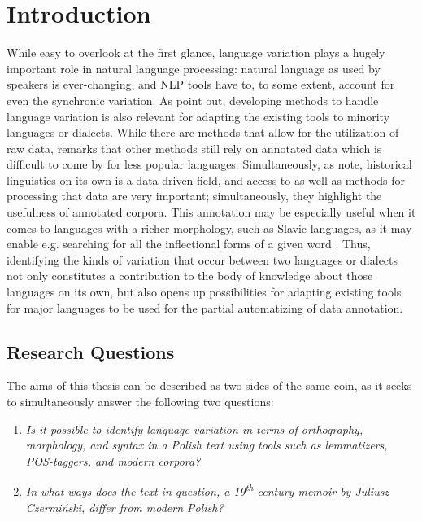 \section{Introduction}
\label{sec:intro}

While easy to overlook at the first glance, language variation plays a hugely important role in natural language processing: natural language as used by speakers is ever-changing, and NLP tools have to, to some extent, account for even the synchronic variation. As \citet{Zampieri2020NaturalLP} point out, developing methods to handle language variation is also relevant for adapting the existing tools to minority languages or dialects. While there are methods that allow for the utilization of raw data, \citet{ponti_2019} remarks that other methods still rely on annotated data which is difficult to come by for less popular languages. Simultaneously, as \citet{quantitative-historical} note, historical linguistics on its own is a data-driven field, and access to as well as methods for processing that data are very important; simultaneously, they highlight the usefulness of annotated corpora. This annotation may be especially useful when it comes to languages with a richer morphology, such as Slavic languages, as it may enable e.g. searching for all the inflectional forms of a given word \citep{pęzik_2012}. Thus, identifying the kinds of variation that occur between two languages or dialects not only constitutes a contribution to the body of knowledge about those languages on its own, but also opens up possibilities for adapting existing tools for major languages to be used for the partial automatizing of data annotation. 

\subsection{Research Questions}
\label{subsec:research-questions}

The aims of this thesis can be described as two sides of the same coin, as it seeks to simultaneously answer the following two questions:
\begin{enumerate}
    \item \textit{Is it possible to identify language variation in terms of orthography, morphology, and syntax in a Polish text using tools such as lemmatizers, POS-taggers, and modern corpora?}
    \item \textit{In what ways does the text in question, a 19\textsuperscript{th}-century memoir by Juliusz Czermiński, differ from modern Polish?}
\end{enumerate}

